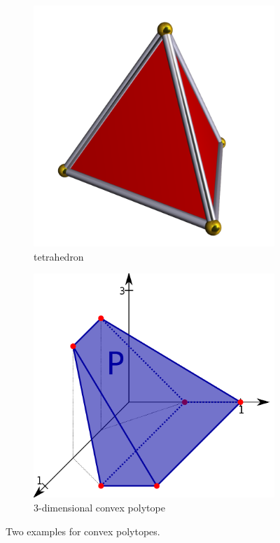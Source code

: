\documentclass[]{article}
\begin{document}
\begin{figure}[!h]
	\begin{subfigure}{0.5\textwidth}
		\includegraphics[width=1\linewidth,height=\textwidth]{Tetrahedron}
		\caption{tetrahedron}
	\end{subfigure}
	\begin{subfigure}{0.5\textwidth}
		\includegraphics[width=1\linewidth,height=\textwidth]{3dpoly}
		\caption{3-dimensional convex polytope}
	\end{subfigure}
	\caption{Two examples for convex polytopes.}
	\label{Fig:polytope}
\end{figure}

\printbibliography[
heading=bibintoc,
title={References}
]
\end{document}
